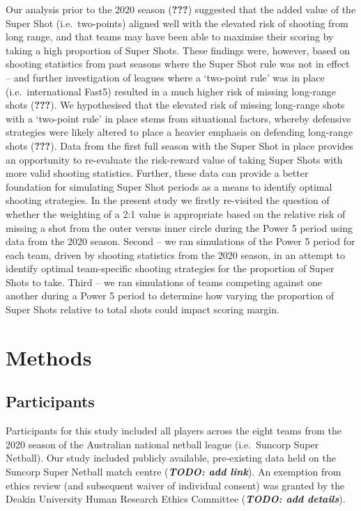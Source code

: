 \documentclass[]{elsarticle} %
\begin{document}
Our analysis prior to the 2020 season ({\textbf{???}}) suggested that
the added value of the Super Shot (i.e.~two-points) aligned well with
the elevated risk of shooting from long range, and that teams may have
been able to maximise their scoring by taking a high proportion of Super
Shots. These findings were, however, based on shooting statistics from
past seasons where the Super Shot rule was not in effect -- and further
investigation of leagues where a `two-point rule' was in place
(i.e.~international Fast5) resulted in a much higher risk of missing
long-range shots ({\textbf{???}}). We hypothesised that the elevated
risk of missing long-range shots with a `two-point rule' in place stems
from situational factors, whereby defensive strategies were likely
altered to place a heavier emphasis on defending long-range shots
({\textbf{???}}). Data from the first full season with the Super Shot in
place provides an opportunity to re-evaluate the risk-reward value of
taking Super Shots with more valid shooting statistics. Further, these
data can provide a better foundation for simulating Super Shot periods
as a means to identify optimal shooting strategies. In the present study
we firstly re-visited the question of whether the weighting of a 2:1
value is appropriate based on the relative risk of missing a shot from
the outer versus inner circle during the Power 5 period using data from
the 2020 season. Second -- we ran simulations of the Power 5 period for
each team, driven by shooting statistics from the 2020 season, in an
attempt to identify optimal team-specific shooting strategies for the
proportion of Super Shots to take. Third -- we ran simulations of teams
competing against one another during a Power 5 period to determine how
varying the proportion of Super Shots relative to total shots could
impact scoring margin.

\hypertarget{methods}{%
\section{Methods}\label{methods}}

\hypertarget{participants}{%
\subsection{Participants}\label{participants}}

Participants for this study included all players across the eight teams
from the 2020 season of the Australian national netball league
(i.e.~Suncorp Super Netball). Our study included publicly available,
pre-existing data held on the Suncorp Super Netball match centre
(\textbf{\emph{TODO: add link}}). An exemption from ethics review (and
subsequent waiver of individual consent) was granted by the Deakin
University Human Research Ethics Committee (\textbf{\emph{TODO: add
details}}).
\end{document}
